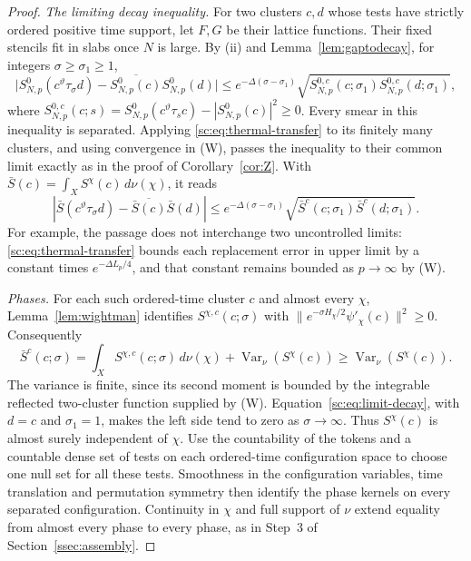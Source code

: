 \begin{proof}
\emph{The limiting decay inequality.}
For two clusters $c,d$ whose tests have strictly ordered positive time support, let $F,G$ be their
lattice functions. Their fixed stencils fit in slabs once $N$ is large.
By (ii) and Lemma~\ref{lem:gaptodecay}, for integers
$\sigma\ge\sigma_1\ge1$,
\[
\bigl|S^0_{N,p}(c^\vartheta\tau_\sigma d)
-\overline{S^0_{N,p}(c)}S^0_{N,p}(d)\bigr|
\le e^{-\Delta(\sigma-\sigma_1)}
\sqrt{S^{0,c}_{N,p}(c;\sigma_1)S^{0,c}_{N,p}(d;\sigma_1)},
\]
where $S^{0,c}_{N,p}(c;s)=S^0_{N,p}(c^\vartheta\tau_s c)
-|S^0_{N,p}(c)|^2\ge0$.
Every smear in this inequality is separated. Applying
\eqref{sc:eq:thermal-transfer} to its finitely many clusters, and using
convergence in \textup{(W)}, passes the inequality to their common limit
exactly as in the proof of Corollary~\ref{cor:Z}. With
$\bar S(c)=\int_XS^\chi(c)\,d\nu(\chi)$, it reads
\begin{equation}\label{sc:eq:limit-decay}
\left|\bar S(c^\vartheta\tau_\sigma d)
-\overline{\bar S(c)}\bar S(d)\right|
\le e^{-\Delta(\sigma-\sigma_1)}
\sqrt{\bar S^c(c;\sigma_1)\bar S^c(d;\sigma_1)}.
\end{equation}
For example, the passage does not interchange two uncontrolled limits:
\eqref{sc:eq:thermal-transfer} bounds each replacement error in upper
limit by a constant times $e^{-\Delta L_p/4}$, and that constant remains
bounded as $p\to\infty$ by \textup{(W)}.

\emph{Phases.}
For each such ordered-time cluster $c$ and almost every $\chi$, Lemma~\ref{lem:wightman} identifies
$S^{\chi,c}(c;\sigma)$ with
$\|e^{-\sigma H_\chi/2}\psi'_\chi(c)\|^2\ge0$.
Consequently
\[
\bar S^c(c;\sigma)
=\int_X S^{\chi,c}(c;\sigma)\,d\nu(\chi)
+\operatorname{Var}_\nu(S^\chi(c))
\ge\operatorname{Var}_\nu(S^\chi(c)).
\]
The variance is finite, since its second moment is bounded by the
integrable reflected two-cluster function supplied by \textup{(W)}.
Equation~\eqref{sc:eq:limit-decay}, with $d=c$ and $\sigma_1=1$, makes the
left side tend to zero as $\sigma\to\infty$. Thus $S^\chi(c)$ is almost
surely independent of $\chi$. Use the countability of the tokens and a
countable dense set of tests on each ordered-time configuration space to
choose one null set for all these tests. Smoothness in the configuration
variables, time translation and permutation symmetry then identify the
phase kernels on every separated configuration. Continuity in $\chi$
and full support of $\nu$ extend equality from almost every phase to
every phase, as in Step~3 of Section~\ref{ssec:assembly}.


\end{proof}
